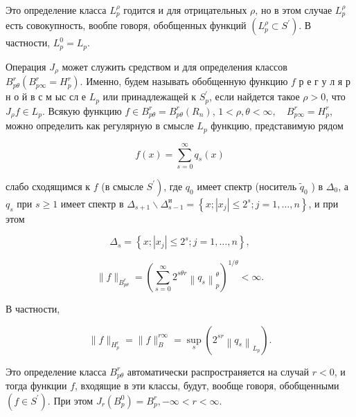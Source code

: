 \documentclass[10pt]{article}
\begin{document}
Это определение класса $L_{p}^{\rho}$ годится и для отрицательных $\rho$, но в этом случае $L_{p}^{\rho}$ есть совокупность, вообпе говоря, обобщенных функций $\left(L_{p}^{\rho} \subset S^{\prime}\right)$. В частности, $L_{p}^{0}=L_{p}$.



Операция $J_{\rho}$ может служить средством и для определения классов $B_{p \theta}^{r}\left(B_{p \infty}^{r}=H_{p}^{r}\right)$. Именно, будем называть обобщенную функцию $f$ р е г у л я р н о й в с м ыс сл е $L_{p}$ или принадлежащей к $S_{p}^{\prime}$, если найдется такое $\rho>0$, что $J_{\rho} f \in L_{p}$. Всякую функцию $f \in B_{p \theta}^{r}=B_{p \theta}^{r}\left(R_{n}\right)$, $1<\rho, \theta<\infty, \quad B_{p \infty}^{r}=H_{p}^{r}$, можно определить как регулярную в смысле $L_{p}$ функцию, представимую рядом



\[

f(x)=\sum_{s=0}^{\infty} q_{s}(x)

\]



слабо сходящимся к $f$ (в смысле $\left.S^{\prime}\right)$, где $q_{0}$ имеет спектр (носитель $\tilde{q}_{0}$ ) в $\Delta_{0}$, а $q_{s}$ при $s \geqslant 1$ имеет спектр в $\Delta_{s+1} \backslash \Delta_{s-1}^{\text {и }}=\left\{x ;\left|x_{j}\right| \leqslant 2^{s} ; j=1, \ldots, n\right\}$, и при этом



\[

\Delta_{s}=\left\{x ;\left|x_{j}\right| \leqslant 2^{s} ; j=1, \ldots, n\right\},

\]



\[

\|f\|_{B_{p \theta}^{r}}=\left(\sum_{s=0}^{\infty} 2^{s \theta r}\left\|q_{s}\right\|_{p}^{\theta}\right)^{1 / \theta}<\infty .

\]



В частности,



\[

\|f\|_{H_{p}^{r}}=\|f\|_{B}^{r \infty}=\sup _{s}\left(2^{s r}\left\|q_{s}\right\|_{L_{p}}\right) .

\]



Это определение класса $B_{p \theta}^{r}$ автоматически распространяется на случай $r<0$, и тогда функции $f$, входящие в эти классы, будут, вообще говоря, обобщенными $\left(f \in S^{\prime}\right)$. При этом $J_{r}\left(B_{p}^{0}\right)=B_{p}^{r},-\infty<r<\infty$.
\end{document}
